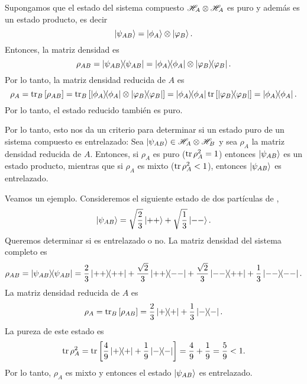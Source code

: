 \documentclass[10pt, a4paper]{article}
\numberwithin{equation}{subsection}
\begin{document}
\bigbreak

Supongamos que el estado del sistema compuesto $\mathscr{H}_A\otimes\mathscr{H}_A$ es
puro y además es un estado producto, es decir
\begin{equation}
  \ket{\psi_{AB}} = \ket{\phi_{A}}\otimes\ket{\varphi_{B}}.
\end{equation}
Entonces, la matriz densidad es
\begin{equation}
  \rho_{AB} = \projector{\psi_{AB}} =
  \projector{\phi_{A}}\tensor\projector{\varphi_{B}}.
\end{equation}
Por lo tanto, la matriz densidad reducida de $A$ es
\begin{equation}
  \rho_A = \tr_B\left[\rho_{AB}\right]
  = \tr_B\left[\projector{\phi_{A}}\tensor\projector{\varphi_{B}}\right]
  = \projector{\phi_{A}}\tr\left[\projector{\varphi_{B}}\right]
  = \projector{\phi_{A}}.
\end{equation}
Por lo tanto, el estado reducido también es puro.

\bigbreak

Por lo tanto, esto nos da un criterio para determinar si un estado puro de un
sistema compuesto es entrelazado:
Sea $\ket{\psi_{AB}} \in \mathscr{H}_A\otimes\mathscr{H}_B$ y sea $\rho_A$ la matriz
densidad reducida de $A$. Entonces, si $\rho_A$ es puro ($\tr\rho_A^2 = 1$)
entonces $\ket{\psi_{AB}}$ es un estado producto, mientras que si $\rho_A$ es
mixto ($\tr\rho_A^2 < 1$), entonces $\ket{\psi_{AB}}$ es entrelazado.

\bigbreak
Veamos un ejemplo. Consideremos el siguiente estado de dos partículas de
\spinhalf,
\begin{equation}
  \ket{\psi_{AB}} = \sqrt{\frac{2}{3}}\ket{++} + \sqrt{\frac{1}{3}}\ket{--}.
\end{equation}
Queremos determinar si es entrelazado o no. La matriz densidad del sistema
completo es
\begin{equation}
  \rho_{AB} = \projector{\psi_{AB}} = \frac{2}{3}\projector{++} +
  \frac{\sqrt{2}}{3}\ketbra{++}{--} + \frac{\sqrt{2}}{3}\ketbra{--}{++} +
  \frac{1}{3}\projector{--}.
\end{equation}
La matriz densidad reducida de $A$ es
\begin{equation}
  \rho_{A} = \tr_B\left[\rho_{AB}\right] = \frac{2}{3}\ketbra{+}{+} +
    \frac{1}{3}\ketbra{-}{-}.
\end{equation}
La pureza de este estado es
\begin{equation}
  \tr\rho_A^2 = \tr\left[\frac{4}{9}\ketbra{+}{+} +
  \frac{1}{9}\ketbra{-}{-}\right] = \frac{4}{9} + \frac{1}{9} = \frac{5}{9} <
  1.
\end{equation}
Por lo tanto, $\rho_{A}$ es mixto y entonces el estado $\ket{\psi_{AB}}$ es
entrelazado.
\end{document}

